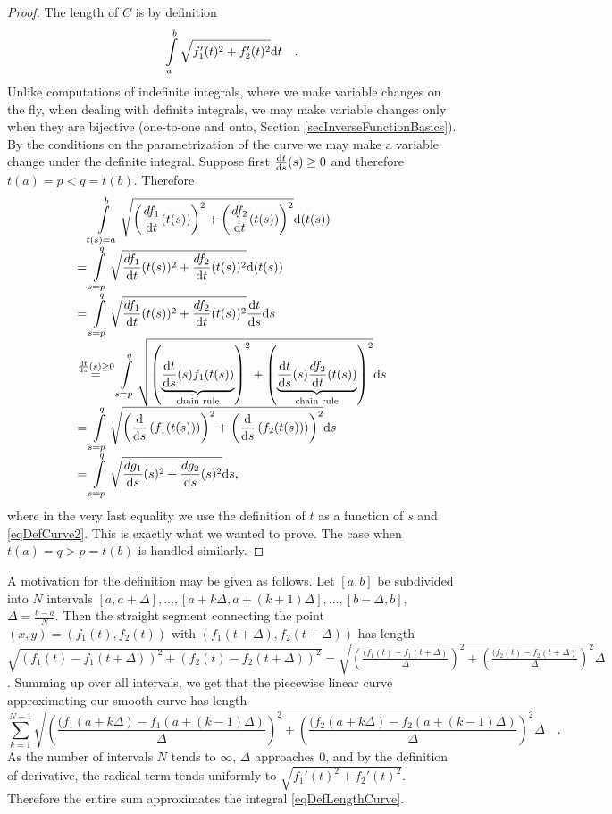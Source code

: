 \documentclass[12pt]{book}
\begin{document}
\begin{proof}
The length of $C$ is by definition
\[
\int\limits_{a}^b \sqrt{f_1'(t)^2+f_2'(t)^2}{\normalfont \text{d}} t \quad .
\]
Unlike computations of indefinite integrals, where we make variable changes on the fly, when dealing with definite integrals, we may make variable changes only when they are bijective (one-to-one and onto, Section \ref{secInverseFunctionBasics}). By the conditions on the parametrization of the curve we may make a variable change under the definite integral. Suppose first $\frac{{\normalfont \text{d}} t}{{\normalfont \text{d}} s}(s)\geq 0$ and therefore $t(a)=p<q=t(b)$. Therefore
\[
\begin{array}{l}
\phantom{=}\displaystyle \int\limits_{t(s)=a}^b \sqrt{\left(\frac{df_1}{{\normalfont \text{d}} t}(t(s))\right)^2+\left(\frac{df_2}{{\normalfont \text{d}} t}(t(s))\right)^2}{\normalfont \text{d}}(t(s)) \\
\displaystyle =  \int \limits_{s=p}^q \sqrt{\frac{df_1}{{\normalfont \text{d}} t}( t(s))^2+ \frac{df_2}{{\normalfont \text{d}} t}(t(s))^2}{\normalfont \text{d}}(t(s))\\
= \displaystyle \int\limits_{s=p}^q \sqrt{\frac{df_1}{{\normalfont \text{d}} t}( t(s))^2 + \frac{df_2 }{{\normalfont \text{d}} t}(t(s))^2} \frac{{\normalfont \text{d}} t}{{\normalfont \text{d}} s}{\normalfont \text{d}} s \\
\displaystyle
\stackrel{\frac{{\normalfont \text{d}} t}{{\normalfont \text{d}} s}(s)\geq 0}{=}  \int\limits_{s=p}^q \sqrt{ \left( \underbrace{ \frac{{\normalfont \text{d}} t}{{\normalfont \text{d}} s}(s) f_1( t(s)) }_{ \text{chain rule} } \right)^2+ \left( \underbrace{ \frac{ {\normalfont \text{d}} t}{{\normalfont \text{d}} s}(s) \frac{df_2}{{\normalfont \text{d}} t} (t(s))}_{ \text{chain rule}} \right)^2}{\normalfont \text{d}} s \\
=\displaystyle \int\limits_{s=p}^q \sqrt{ \left(\frac{{\normalfont \text{d}}}{{\normalfont \text{d}} s}\left(f_1(t(s))\right)\right)^2+ \left(\frac{{\normalfont \text{d}}}{{\normalfont \text{d}} s}\left(f_2(t(s))\right)\right)^2}{\normalfont \text{d}} s \\
=\displaystyle \int\limits_{s=p}^q \sqrt{ \frac{ dg_1}{ {\normalfont \text{d}} s}( s)^2 + \frac{dg_2}{{\normalfont \text{d}} s}(s)^2}{\normalfont \text{d}} s,
\quad
\end{array}
\]
where in the very last equality we use the definition of $t$ as a function of $s$ and \eqref{eqDefCurve2}. This is exactly what we wanted to prove. The case when $t(a)=q>p=t(b)$ is handled similarly.
\end{proof}

A motivation for the definition may be given as follows. Let $[a,b]$ be subdivided into $N$ intervals $[a,a+\Delta ], \dots, [a+k\Delta, a+(k+1)\Delta],\dots, [b-\Delta, b]$, $\Delta=\frac{b-a}{N}$. Then the straight segment connecting the point $(x,y)=(f_1(t), f_2(t))$ with $(f_1(t+\Delta), f_2(t+\Delta))$ has length $\sqrt{(f_1(t)-f_1(t+\Delta))^2 + (f_2(t)-f_2(t+\Delta))^2}= \sqrt{\left(\frac{(f_1(t)-f_1(t+\Delta)}{\Delta}\right)^2 + \left(\frac{(f_2(t)- f_2(t+\Delta)}{\Delta} \right)^2}\Delta$. Summing up over all intervals, we get that the piecewise linear curve approximating our smooth curve has length
\[
\sum_{k=1}^{N-1} \sqrt{\left(\frac{(f_1(a+k\Delta)-f_1(a+(k-1)\Delta)}{\Delta}\right)^2 + \left(\frac{(f_2(a+k\Delta)- f_2(a+(k-1)\Delta)}{\Delta} \right)^2}\Delta\quad .
\]
As the number of intervals $N$ tends to $\infty$, $\Delta$ approaches 0, and by the definition of derivative, the radical term tends uniformly to $\sqrt{f_1'(t)^2+f_2'(t)^2}$. Therefore the entire sum approximates the integral \eqref{eqDefLengthCurve}.
\end{document}
